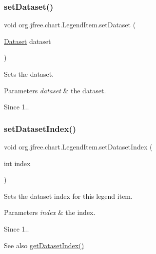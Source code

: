 \subsubsection{\texorpdfstring{set\+Dataset()}{setDataset()}}
{\footnotesize\ttfamily void org.\+jfree.\+chart.\+Legend\+Item.\+set\+Dataset (\begin{DoxyParamCaption}\item[{\mbox{\hyperlink{interfaceorg_1_1jfree_1_1data_1_1general_1_1_dataset}{Dataset}}}]{dataset }\end{DoxyParamCaption})}

Sets the dataset.


\begin{DoxyParams}{Parameters}
{\em dataset} & the dataset.\\
\hline
\end{DoxyParams}
\begin{DoxySince}{Since}
1.. 
\end{DoxySince}
\mbox{\label{classorg_1_1jfree_1_1chart_1_1_legend_item_a34b68265023efe9e950bb9fa8cc927dc}} 
\subsubsection{\texorpdfstring{set\+Dataset\+Index()}{setDatasetIndex()}}
{\footnotesize\ttfamily void org.\+jfree.\+chart.\+Legend\+Item.\+set\+Dataset\+Index (\begin{DoxyParamCaption}\item[{int}]{index }\end{DoxyParamCaption})}

Sets the dataset index for this legend item.


\begin{DoxyParams}{Parameters}
{\em index} & the index.\\
\hline
\end{DoxyParams}
\begin{DoxySince}{Since}
1..
\end{DoxySince}
\begin{DoxySeeAlso}{See also}
\mbox{\hyperlink{classorg_1_1jfree_1_1chart_1_1_legend_item_a211d17c1d0c314e7445cbd574cbafb41}{get\+Dataset\+Index()}} 
\end{DoxySeeAlso}
\mbox{\label{classorg_1_1jfree_1_1chart_1_1_legend_item_a6260a832309908f4b41f005d9ace3f23}} 

